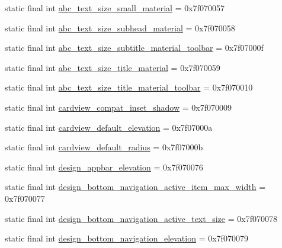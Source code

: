 \begin{CompactItemize}
\item 
static final int \hyperlink{classcom_1_1companyname_1_1x__2doo_1_1_r_1_1dimen_c64cf1c5f56d1e31093cadc092db4a7a}{abc\_\-text\_\-size\_\-small\_\-material} = 0x7f070057
\item 
static final int \hyperlink{classcom_1_1companyname_1_1x__2doo_1_1_r_1_1dimen_8381fbed978845a3a9e493d3f905ff4c}{abc\_\-text\_\-size\_\-subhead\_\-material} = 0x7f070058
\item 
static final int \hyperlink{classcom_1_1companyname_1_1x__2doo_1_1_r_1_1dimen_323ab26f3cd1dd67fe046010621c5621}{abc\_\-text\_\-size\_\-subtitle\_\-material\_\-toolbar} = 0x7f07000f
\item 
static final int \hyperlink{classcom_1_1companyname_1_1x__2doo_1_1_r_1_1dimen_e1cb3c6ffe94a300bf84514e1cfd2755}{abc\_\-text\_\-size\_\-title\_\-material} = 0x7f070059
\item 
static final int \hyperlink{classcom_1_1companyname_1_1x__2doo_1_1_r_1_1dimen_0ab7353c285908293ca30c9073ac3340}{abc\_\-text\_\-size\_\-title\_\-material\_\-toolbar} = 0x7f070010
\item 
static final int \hyperlink{classcom_1_1companyname_1_1x__2doo_1_1_r_1_1dimen_71021edcae506cca12dd5d43214ee0cd}{cardview\_\-compat\_\-inset\_\-shadow} = 0x7f070009
\item 
static final int \hyperlink{classcom_1_1companyname_1_1x__2doo_1_1_r_1_1dimen_c1b908a2463544ac086167f893d10946}{cardview\_\-default\_\-elevation} = 0x7f07000a
\item 
static final int \hyperlink{classcom_1_1companyname_1_1x__2doo_1_1_r_1_1dimen_5b938a5e2725c0081c802d7fd1bc03ce}{cardview\_\-default\_\-radius} = 0x7f07000b
\item 
static final int \hyperlink{classcom_1_1companyname_1_1x__2doo_1_1_r_1_1dimen_441e2b293c7c6a32bccfb8cda666f5b6}{design\_\-appbar\_\-elevation} = 0x7f070076
\item 
static final int \hyperlink{classcom_1_1companyname_1_1x__2doo_1_1_r_1_1dimen_775b97b43799108496328408879288fb}{design\_\-bottom\_\-navigation\_\-active\_\-item\_\-max\_\-width} = 0x7f070077
\item 
static final int \hyperlink{classcom_1_1companyname_1_1x__2doo_1_1_r_1_1dimen_06c10b917299e691b7db453702ea6216}{design\_\-bottom\_\-navigation\_\-active\_\-text\_\-size} = 0x7f070078
\item 
static final int \hyperlink{classcom_1_1companyname_1_1x__2doo_1_1_r_1_1dimen_551b8d2ccf299d479c56bf187c75b45b}{design\_\-bottom\_\-navigation\_\-elevation} = 0x7f070079

\end{CompactItemize}
